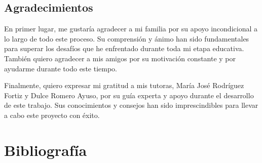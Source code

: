 \documentclass[10pt]{article}
\begin{document}
\newpage
\thispagestyle{empty}
\null
\newpage

\subsection*{Agradecimientos}
En primer lugar, me gustaría agradecer a mi familia por su apoyo incondicional a lo largo de todo este proceso.
Su comprensión y ánimo han sido fundamentales para superar los desafíos que he enfrentado durante toda mi etapa educativa.
También quiero agradecer a mis amigos por su motivación constante y por ayudarme durante todo este tiempo.

Finalmente, quiero expresar mi gratitud a mis tutoras, María José Rodríguez Fortiz y Dulce Romero Ayuso, por su guía experta y apoyo durante el desarrollo de este trabajo.
Sus conocimientos y consejos han sido imprescindibles para llevar a cabo este proyecto con éxito.

\newpage

\newpage
\thispagestyle{empty}
\null
\newpage

\newpage
\tableofcontents
\newpage
\listoffigures
\newpage
\listoftables

\newpage


\newpage


\newpage


\newpage


\newpage


\newpage


% 

\newpage
\section{Bibliografía}
\renewcommand{\bibitemsep}{1em}
\printbibliography[heading=empty]
\end{document}
